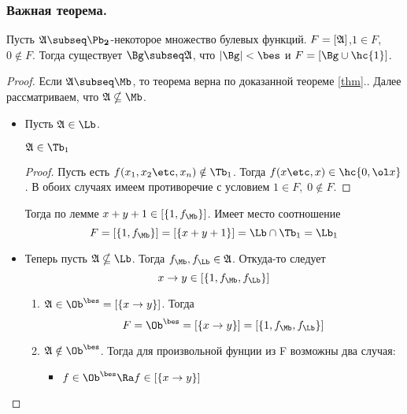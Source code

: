 \documentclass[unicode, 10pt, a4paper, oneside, fleqn]{article}
\begin{document}
\subsubsection{Важная теорема.}
\begin{theorem}
  Пусть $\ag\subseq\PD$-некоторое множество булевых функций. $F=[\mathfrak{A}]$,$1\in F$,$0\notin F$.
  Тогда существует $\Bg\subseq\ag$, что $|\Bg|<\bes$ и $F=[\Bg\cup\hc{1}]$.
\end{theorem}
\begin{proof}
  Если $\ag\subseq\Mb$, то теорема верна по доказанной теореме \ref{thm}.\REF. Далее рассматриваем,
  что $\ag\nsubseq\Mb$.
  \begin{itemize}
    \item Пусть $\ag\in\Lb$. 
      \begin{stm}
        \begin{math}
          \ag\in\Tb_1
        \end{math}
      \end{stm}
      \begin{proof}
        Пусть есть $f(\set[x]{n})\notin\Tb_1$. Тогда $f(x\etc,x)\in\hc{0,\ol x}$.
        В обоих случаях имеем противоречие с условием $1\in F,\;0\notin F$.
      \end{proof}
      Тогда по лемме \REF $x+y+1\in\cls{1,\fM}$. Имеет место соотношение \WHY
      \begin{displaymath}
        F=\cls{1,\fM}=\cls{x+y+1}=\Lb\cap\Tb_1=\Lb_1
      \end{displaymath}
    \item Теперь пусть $\ag\nsubseq\Lb$. Тогда $\fM,\fL\in\ag$. Откуда-то следует \WHY
      \begin{displaymath}
        x\to y\in\cls{1,\fM,\fL}
      \end{displaymath}
      \begin{enumerate}
        \item $\ag\in\Oib=\cls{x\to y}$. Тогда 
          \begin{displaymath}
            F=\Oib=\cls{x\to y}=\cls{1,\fM,\fL}
          \end{displaymath}
        \item $\ag\notin\Oib$. Тогда для произвольной фунции из F возможны два случая:
          \begin{itemize}
            \item 
              \begin{math}
                f\in\Oib \Ra f\in\cls{x\to y}
              \end{math}

\end{itemize}
\end{enumerate}
\end{itemize}
\end{proof}
\end{document}

